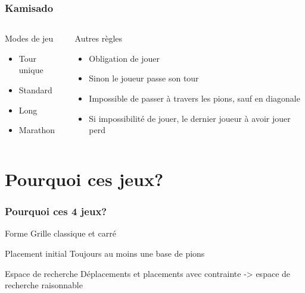 \documentclass[11pt]{beamer}
\begin{document}
\begin{frame}

\frametitle{Kamisado}
\begin{columns}[t]
    \begin{column}{3cm}
        \begin{block}{Modes de jeu}
            \begin{itemize}
                \item Tour unique
                \item Standard
                \item Long
                \item Marathon
            \end{itemize}
        \end{block}
    \end{column}
    
    \begin{column}{7cm}
        \begin{block}{ Autres règles}
            \begin{itemize}
                \item Obligation de jouer
                \item Sinon le joueur passe son tour
                \item Impossible de passer à travers les pions, sauf en diagonale
                
                \item Si impossibilité de jouer, le dernier joueur à avoir jouer perd
            \end{itemize}
        \end{block}
    \end{column}
\end{columns}

\end{frame}

\section{Pourquoi ces jeux?}  

  \begin{frame}
  \frametitle{Pourquoi ces 4 jeux?}\begin{block}{ Forme }
  	Grille classique et carré
  \end{block}\begin{block}{ Placement initial }
  	Toujours au moins une base de pions
  \end{block}\begin{block}{ Espace de recherche }
  	Déplacements et placements avec contrainte -> espace de recherche raisonnable
  \end{block}
  
\end{frame}
\end{document}
